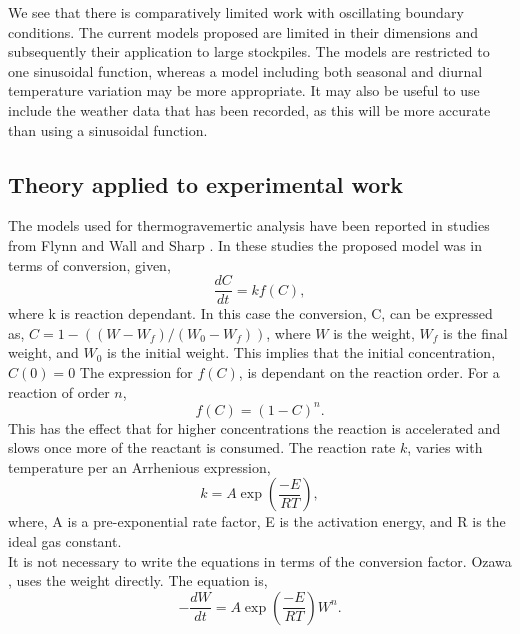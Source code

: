 We see that there is comparatively limited work with oscillating boundary conditions. The current models proposed are limited in their dimensions and subsequently their application to large stockpiles. The models are restricted to one sinusoidal function, whereas a model including both seasonal and diurnal temperature variation may be more appropriate.
 It may also be useful to use include the weather data that has been recorded, as this will be more accurate than using a sinusoidal function.

\subsection{Theory applied to experimental work}
\label{Kis}
The models used for thermogravemertic analysis have been reported in studies from Flynn and Wall \cite{flynn66} and Sharp \cite{sharp69}. In these studies the proposed model was in terms of conversion, given,
\begin{equation}
\frac{dC}{dt}=kf(C), \label{fl}
\end{equation}
where k is reaction dependant. In this case the conversion, C, can be expressed as, $C=1-\left(\left(W-W_f\right)/\left(W_0-W_f\right)\right)$, where $W$ is the weight, $W_f$ is the final weight, and $W_0$ is the initial weight. This implies that the initial concentration, $C(0)=0$ The expression for $f(C)$, is dependant on the reaction order. For a reaction of order $n$,
\begin{equation}
f(C)=(1-C)^n.
\end{equation}
This has the effect that for higher concentrations the reaction is accelerated and slows once more of the reactant is consumed. The reaction rate $k$, varies with temperature per an Arrhenious expression, \\
\begin{equation}
k=A\exp\left(\frac{-E}{RT}\right),
\end{equation}
where, A is a pre-exponential rate factor, E is the activation energy, and R is the ideal gas constant.\\
It is not necessary to write the equations in terms of the conversion factor. Ozawa \cite{ozawa65}, uses the weight directly. The equation is,
\begin{equation}
-\frac{dW}{dt}=A\exp\left(\frac{-E}{RT}\right) W^n. \label{oz}
\end{equation} 
